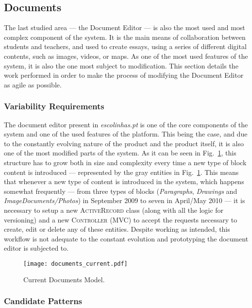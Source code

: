 \subsection{Documents}\label{sec:fa_documents}

The last studied area --- the Document Editor --- is also the most used and most complex component of the system. It is the main means of collaboration between students and teachers, and used to create essays, using a series of different digital contents, such as images, videos, or maps. As one of the most used features of the system, it is also the one most subject to modification. This section details the work performed in order to make the process of modifying the Document Editor as agile as possible.

\subsubsection{Variability Requirements}\label{sec:fa_documents_variability_requirements}

The document editor present in \emph{escolinhas.pt} is one of the core components of the system and one of the used features of the platform. This being the case, and due to the constantly evolving nature of the product and the product itself, it is also one of the most modified parts of the system. As it can be seen in Fig.~\ref{fig:documents_current}, this structure has to grow both in size and complexity every time a new type of block content is introduced --- represented by the gray entities in Fig.~\ref{fig:documents_current}. This means that whenever a new type of content is introduced in the system, which happens somewhat frequently --- from three types of blocks (\emph{Paragraphs}, \emph{Drawings} and \emph{ImageDocuments/Photos}) in September 2009 to seven in April/May 2010 --- it is necessary to setup a new \textsc{ActiveRecord} class (along with all the logic for versioning) and a new \textsc{Controller} (MVC) to accept the requests necessary to create, edit or delete any of these entities. Despite working as intended, this workflow is not adequate to the constant evolution and prototyping the document editor is subjected to.

\begin{figure}[H]
  \centering
  \texttt{[image: documents\_current.pdf]}
  \caption{Current Documents Model.}
  \label{fig:documents_current}
\end{figure}

\subsubsection{Candidate Patterns}\label{sec:fa_documents_candidate_patterns}

